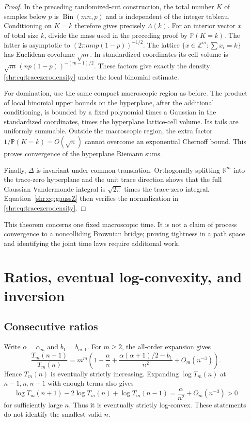 \documentclass[11pt,letterpaper]{article}
\numberwithin{equation}{section}
\theoremstyle{definition}
\newcommand{\Pp}{\mathbb P}
\newcommand{\R}{\mathbb R}
\newcommand{\1}{\mathbf 1}
\begin{document}
\begin{proof}
In the preceding randomized-cut construction, the total number $K$ of
samples below $p$ is $\operatorname{Bin}(mn,p)$ and is independent of the
integer tableau. Conditioning on $K=k$ therefore gives precisely
$\Lambda(k)$. For an interior vector $x$ of total size $k$, divide the
mass used in the preceding proof by $\Pp(K=k)$.
The latter is asymptotic to $(2\pi mnp(1-p))^{-1/2}$.
The lattice $\{x\in\mathbb Z^m:\sum x_i=k\}$ has Euclidean covolume
$\sqrt m$. In standardized coordinates its cell volume is
$\sqrt m\,(np(1-p))^{-(m-1)/2}$. These factors give exactly the density
\eqref{shr:eq:tracezerodensity} under the local binomial estimate.

For domination, use the same compact macroscopic region as before.
The product of local binomial upper bounds on the hyperplane, after the
additional conditioning, is bounded by a fixed polynomial times a Gaussian
in the standardized coordinates, times the hyperplane lattice-cell
volume. Its tails are uniformly summable. Outside the macroscopic region,
the extra factor $1/\Pp(K=k)=O(\sqrt n)$ cannot overcome an exponential
Chernoff bound. This proves convergence of the hyperplane Riemann sums.

Finally, $\Delta$ is invariant under common translation. Orthogonally
splitting $\R^m$ into the trace-zero hyperplane and the unit trace direction
shows that the full Gaussian Vandermonde integral is $\sqrt{2\pi}$ times
the trace-zero integral. Equation~\eqref{shr:eq:gaussZ} then verifies the
normalization in \eqref{shr:eq:tracezerodensity}.
\end{proof}

This theorem concerns one fixed macroscopic time. It is not a claim of
process convergence to a noncolliding Brownian bridge; proving tightness
in a path space and identifying the joint time laws require additional
work.

\section{Ratios, eventual log-convexity, and inversion}\label{shr:sec:inverse}

\subsection{Consecutive ratios}
Write $\alpha=\alpha_m$ and $b_1=b_{m,1}$. For $m\ge2$, the all-order
expansion gives
\begin{equation}
 \frac{T_m(n+1)}{T_m(n)}=m^m
 \left(1-\frac\alpha n+
 \frac{\alpha(\alpha+1)/2-b_1}{n^2}+O_m(n^{-3})\right).
 \label{shr:eq:ratio}
\end{equation}
Hence $T_m(n)$ is eventually strictly increasing. Expanding
$\log T_m(n)$ at $n-1,n,n+1$ with enough terms also gives
\begin{equation}
 \log T_m(n+1)-2\log T_m(n)+\log T_m(n-1)
 =\frac\alpha{n^2}+O_m(n^{-3})>0
\end{equation}
for sufficiently large $n$. Thus it is eventually strictly log-convex.
These statements do not identify the smallest valid $n$.
\end{document}
